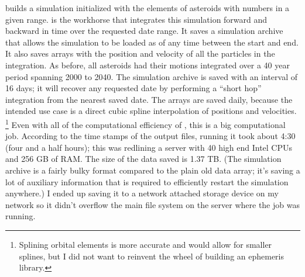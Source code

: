  builds a  simulation initialized with the elements of asteroids with numbers in a given range.
 is the workhorse that integrates this simulation forward and backward in time over the requested date range.
It saves a  simulation archive that allows the simulation to be loaded as of any time between the start and end.
It also saves  arrays with the position and velocity of all the particles in the integration.
As before, all asteroids had their motions integrated over a 40 year period spanning 2000 to 2040.
The simulation archive is saved with an interval of 16 days; it will recover any requested date by performing 
a ``short hop'' integration from the nearest saved date.
The  arrays are saved daily, because the intended use case is a direct cubic spline interpolation of positions and velocities.
\footnote{Splining orbital elements is more accurate and would allow for smaller splines, but I did not want to reinvent the wheel
of building an ephemeris library.}
Even with all of the computational efficiency of , this is a big computational job.
According to the time stamps of the output files, running it took about 4:30 (four and a half hours); 
this was redlining a server with 40 high end Intel CPUs and 256 GB of RAM.
The size of the data saved is 1.37 TB.  
(The  simulation archive is a fairly bulky format compared to the plain old data array; 
it's saving a lot of auxiliary information that is required to efficiently restart the simulation anywhere.)
I ended up saving it to a network attached storage device on my network so it didn't overflow the main file system on the server where the job was running.

